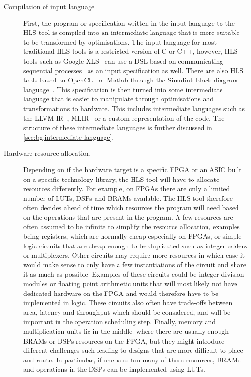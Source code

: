 \begin{description}
\item[Compilation of input language] First, the program or specification written
  in the input language to the \gls{HLS} tool is compiled into an intermediate
  language that is more suitable to be transformed by optimisations.  The input
  language for most traditional \gls{HLS} tools is a restricted version of C or
  C++, however, \gls{HLS} tools such as Google XLS~\cite{google24_gx} can use a
  \gls{DSL} based on communicating sequential
  processes~\cite{hoare78_commun_sequen_proces} as an input specification as
  well.  There are also \gls{HLS} tools based on
  OpenCL~\cite{intel20_sdk_openc_applic} or Matlab through the Simulink block
  diagram language~\cite{constantinides01_mwp,ou05_msf}.  This specification is
  then turned into some intermediate language that is easier to manipulate
  through optimisations and transformations to hardware.  This includes
  intermediate languages such as the LLVM \gls{IR}~\cite{lattner04_llvm},
  MLIR~\cite{lattner21_mlir} or a custom representation of the code.  The
  structure of these intermediate languages is further discussed in
  \cref{sec:bg:intermediate-language}.

\item[Hardware resource allocation] Depending on if the hardware target is a
  specific \gls{FPGA} or an \gls{ASIC} built on a specific technology library,
  the \gls{HLS} tool will have to allocate resources differently.  For example,
  on \glspl{FPGA} there are only a limited number of \glspl{LUT}, \glspl{DSP}
  and \glspl{BRAM} available.  The \gls{HLS} tool therefore often decides ahead
  of time which resources the program will need based on the operations that are
  present in the program.  A few resources are often assumed to be infinite to
  simplify the resource allocation, examples being registers, which are normally
  cheap especially on \glspl{FPGA}, or simple logic circuits that are cheap
  enough to be duplicated such as integer adders or multiplexers.  Other
  circuits may require more resources in which case it would make sense to only
  have a few instantiations of the circuit and share it as much as possible.
  Examples of these circuits could be integer division modules or floating point
  arithmetic units that will most likely not have dedicated hardware on the
  \gls{FPGA} and would therefore have to be implemented in logic.  These
  circuits also often have trade-offs between area, latency and throughput which
  should be considered, and will be important in the operation scheduling step.
  Finally, memory and multiplication units lie in the middle, where there are
  usually enough \glspl{BRAM} or \glspl{DSP} resources on the \gls{FPGA}, but
  they might introduce different challenges such leading to designs that are
  more difficult to place-and-route.  In particular, if one uses too many of
  these resources, \glspl{BRAM} and operations in the \glspl{DSP} can be
  implemented using \glspl{LUT}.


\end{description}
